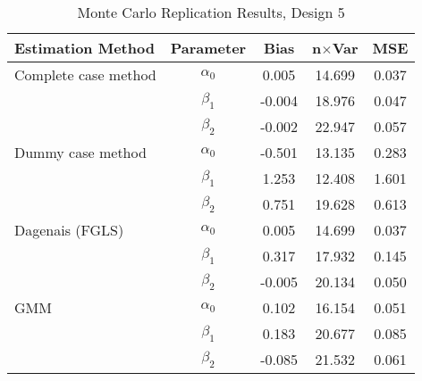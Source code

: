 \begin{table}
\centering
\caption{Monte Carlo Replication Results, Design 5}
\label{table:MCReplicationResultsDesign5}
\begin{tabular}{lcccc}
\toprule
Estimation Method & Parameter & Bias & n$\times$Var & MSE \\
\midrule
Complete case method & $\alpha_0$ & 0.005 & 14.699 & 0.037 \\
 & $\beta_1$ & -0.004 & 18.976 & 0.047 \\
 & $\beta_2$ & -0.002 & 22.947 & 0.057 \\
Dummy case method & $\alpha_0$ & -0.501 & 13.135 & 0.283 \\
 & $\beta_1$ & 1.253 & 12.408 & 1.601 \\
 & $\beta_2$ & 0.751 & 19.628 & 0.613 \\
Dagenais (FGLS) & $\alpha_0$ & 0.005 & 14.699 & 0.037 \\
 & $\beta_1$ & 0.317 & 17.932 & 0.145 \\
 & $\beta_2$ & -0.005 & 20.134 & 0.050 \\
GMM & $\alpha_0$ & 0.102 & 16.154 & 0.051 \\
 & $\beta_1$ & 0.183 & 20.677 & 0.085 \\
 & $\beta_2$ & -0.085 & 21.532 & 0.061 \\
\bottomrule
\end{tabular}
\end{table}
